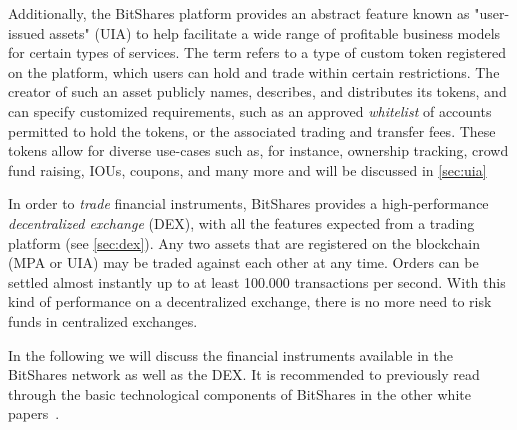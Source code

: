 Additionally, the BitShares platform provides an abstract feature known as
"user-issued assets" (UIA) to help facilitate a wide range of profitable
business models for certain types of services. The term refers to a type of
custom token registered on the platform, which users can hold and trade within
certain restrictions. The creator of such an asset publicly names, describes,
and distributes its tokens, and can specify customized requirements, such as an
approved \emph{whitelist} of accounts permitted to hold the tokens, or the
associated trading and transfer fees. These tokens allow for diverse use-cases
such as, for instance, ownership tracking, crowd fund raising, IOUs, coupons,
and many more and will be discussed in \cref{sec:uia}

In order to \emph{trade} financial instruments, BitShares provides a
high-performance \emph{decentralized exchange} (DEX), with all the features
expected from a trading platform (see \cref{sec:dex}). Any two assets that are
registered on the blockchain (MPA or UIA) may be traded against each other at
any time. Orders can be settled almost instantly up to at least 100.000
transactions per second.  With this kind of performance on a decentralized
exchange, there is no more need to risk funds in centralized exchanges.


In the following we will discuss the financial instruments available in the
BitShares network as well as the DEX. It is recommended to previously read
through the basic technological components of BitShares in the other white
papers~\cite{bts:general,bts:growth,bts:structure}.
